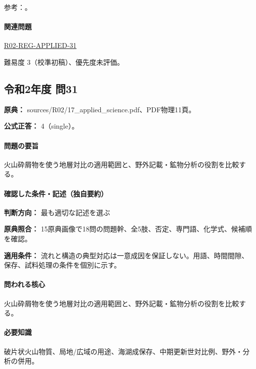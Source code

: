\par 参考：\cite{strat_pollen_tokushima,strat_gsj_atsumi}。

\paragraph{関連問題} \hyperref[q:r02-reg-applied-31]{R02-REG-APPLIED-31}

\par 難易度 3（校準初稿）、優先度未評価。

\subsection{令和2年度 問31}
\label{q:r02-reg-applied-31}

\noindent\textbf{原典：} sources/R02/17\_applied\_science.pdf、PDF物理11頁。

\textbf{公式正答：} 4（single）。

\paragraph{問題の要旨} 火山砕屑物を使う地層対比の適用範囲と、野外記載・鉱物分析の役割を比較する。

\paragraph{確認した条件・記述（独自要約）}\mbox{}\par

\noindent\textbf{判断方向：} 最も適切な記述を選ぶ\par

\noindent\textbf{原典照合：} 15原典画像で18問の問題幹、全5肢、否定、専門語、化学式、候補順を確認。\par

\noindent\textbf{適用条件：} 流れと構造の典型対応は一意成因を保証しない。用語、時間間隙、保存、試料処理の条件を個別に示す。\par

\paragraph{問われる核心} 火山砕屑物を使う地層対比の適用範囲と、野外記載・鉱物分析の役割を比較する。

\paragraph{必要知識} 破片状火山物質、局地/広域の用途、海湖成保存、中期更新世対比例、野外・分析の併用。

